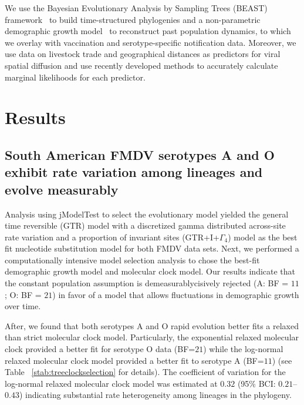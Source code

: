 \documentclass[10pt]{article}
\begin{document}
We use the Bayesian Evolutionary Analysis by Sampling Trees (BEAST) framework~\cite{beast2012} to build time-structured phylogenies and a non-parametric demographic growth model~\cite{skyride} to reconstruct past population dynamics, to which we overlay with vaccination and serotype-specific notification data.
Moreover, we use data on livestock trade and geographical distances as predictors for viral spatial diffusion and use recently developed methods to accurately calculate marginal likelihoods for each predictor.

\section*{Results}

\subsection*{South American FMDV serotypes A and O exhibit rate variation among lineages and evolve measurably}

Analysis using jModelTest to select the evolutionary model yielded the general time reversible (GTR) model with a discretized gamma distributed across-site rate variation and a proportion of invariant sites (GTR+I+$\Gamma_{4}$) model as the best fit nucleotide substitution model for both FMDV data sets.
Next, we performed a computationally intensive model selection analysis to chose the best-fit demographic growth model and molecular clock model.
Our results indicate that the constant population assumption is demeasurablycisively rejected (A: BF = $11$; O: BF = $21$) in favor of a model that allows fluctuations in demographic growth over time. 

After, we found that both serotypes A and O rapid evolution better fits a relaxed than strict molecular clock model.
Particularly, the exponential relaxed molecular clock provided a better fit for serotype O data (BF=$21$) while the log-normal relaxed molecular clock model provided a better fit to serotype A (BF=$11$) (see Table ~\ref{stab:treeclockselection} for details). 
The coefficient of variation for the log-normal relaxed molecular clock model was estimated at $0.32$ (95\% BCI: $ 0.21$--$0.43$) indicating substantial rate heterogeneity among lineages in the phylogeny. 
\end{document}
